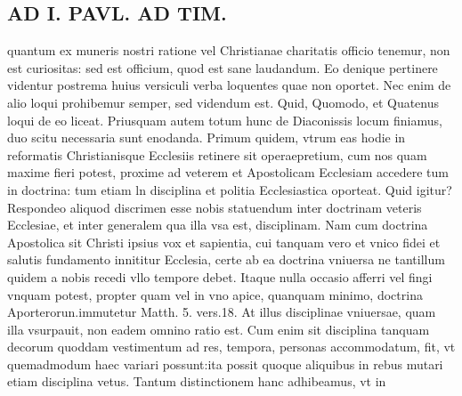 \documentclass{article}
\begin{document}
\begin{pages}
\section*{AD I. PAVL. AD TIM. }
\marginpar{[ p.286 ]}\pstart quantum ex muneris nostri ratione vel Christianae charitatis officio tenemur, non est curiositas: sed est officium, quod est sane laudandum. Eo denique pertinere videntur postrema huius versiculi verba loquentes quae non oportet. Nec enim de alio loqui prohibemur semper, sed videndum est. Quid, Quomodo, et Quatenus loqui de eo liceat. Priusquam autem totum hunc de Diaconissis locum finiamus, duo scitu necessaria sunt enodanda. Primum quidem, vtrum eas hodie in reformatis Christianisque Ecclesiis retinere sit operaepretium, cum nos quam maxime fieri potest, proxime ad veterem et Apostolicam Ecclesiam accedere tum in doctrina: tum etiam ln disciplina et politia Ecclesiastica oporteat. Quid igitur? Respondeo aliquod discrimen esse nobis statuendum inter doctrinam veteris Ecclesiae, et inter generalem qua illa vsa est, disciplinam. Nam cum doctrina Apostolica sit Christi ipsius vox et sapientia, cui tanquam vero et vnico fidei et salutis fundamento innititur Ecclesia, certe ab ea doctrina vniuersa ne tantillum quidem a nobis recedi vllo tempore debet. Itaque nulla occasio afferri vel fingi vnquam potest, propter quam vel in vno apice, quanquam minimo, doctrina Aporterorun.immutetur Matth. 5. vers.18. At illus disciplinae vniuersae, quam illa vsurpauit, non eadem omnino ratio est. Cum enim sit disciplina tanquam decorum quoddam vestimentum ad res, tempora, personas accommodatum, fit, vt quemadmodum haec variari possunt:ita possit quoque aliquibus in rebus mutari etiam disciplina vetus. Tantum distinctionem hanc adhibeamus, vt in  \pend

\end{pages}
\end{document}
